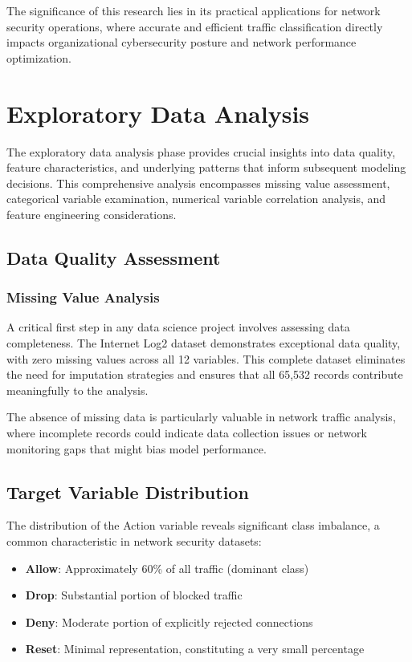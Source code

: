\documentclass[12pt,a4paper]{article}
\begin{document}
The significance of this research lies in its practical applications for network security operations, where accurate and efficient traffic classification directly impacts organizational cybersecurity posture and network performance optimization.

\section{Exploratory Data Analysis}

The exploratory data analysis phase provides crucial insights into data quality, feature characteristics, and underlying patterns that inform subsequent modeling decisions. This comprehensive analysis encompasses missing value assessment, categorical variable examination, numerical variable correlation analysis, and feature engineering considerations.

\subsection{Data Quality Assessment}

\subsubsection{Missing Value Analysis}

A critical first step in any data science project involves assessing data completeness. The Internet Log2 dataset demonstrates exceptional data quality, with zero missing values across all 12 variables. This complete dataset eliminates the need for imputation strategies and ensures that all 65,532 records contribute meaningfully to the analysis.

The absence of missing data is particularly valuable in network traffic analysis, where incomplete records could indicate data collection issues or network monitoring gaps that might bias model performance.

\subsection{Target Variable Distribution}

The distribution of the Action variable reveals significant class imbalance, a common characteristic in network security datasets:

\begin{itemize}
    \item \textbf{Allow}: Approximately 60\% of all traffic (dominant class)
    \item \textbf{Drop}: Substantial portion of blocked traffic
    \item \textbf{Deny}: Moderate portion of explicitly rejected connections
    \item \textbf{Reset}: Minimal representation, constituting a very small percentage
\end{itemize}
\end{document}
